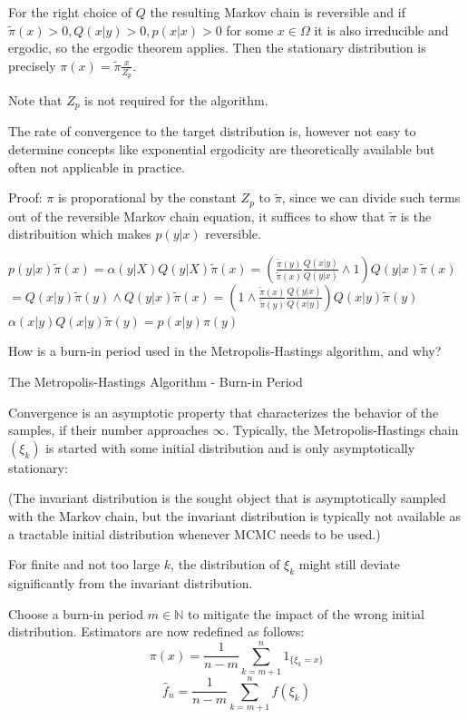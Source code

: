 For the right choice of \( Q \) the resulting Markov chain is reversible 
and if \( \tilde{\pi}(x) > 0, Q(x|y) > 0, p(x|x) > 0  \) for some \( x \in \Omega \)
it is also irreducible and ergodic, so the ergodic theorem applies.
Then the stationary distribution is precisely \( \pi(x) = \tilde{\pi }\frac{x}{Z_p} \).

Note that \( Z_p \) is not required for the algorithm.

The rate of convergence to the target distribution is, however not easy to determine
concepts like exponential ergodicity are theoretically available but often not applicable in practice.

Proof: 
\( \pi \) is proporational by the constant \( Z_p \) to \( \tilde{\pi} \), since we can divide such terms out of the 
reversible Markov chain equation, it suffices to show that \( \tilde{\pi} \) is the distribuition which makes \( p(y|x) \) reversible.

\( p(y|x)\tilde{\pi}(x) = \alpha(y|X)Q(y|X)\tilde{\pi}(x) = (\frac{\tilde{\pi}(y)}{\tilde{\pi}(x)} \frac{Q(x|y)}{Q(y|x)} \wedge 1)Q(y|x)\tilde{\pi}(x) \)
\( =  Q(x|y)\tilde{\pi}(y) \wedge Q(y|x)\tilde{\pi}(x) = (1 \wedge \frac{\tilde{\pi}(x)}{\tilde{\pi}(y)} \frac{Q(y|x)}{Q(x|y)})Q(x|y)\tilde{\pi}(y) \)
\( \alpha(x|y)Q(x|y)\tilde{\pi}(y) = p(x|y)\pi(y) \)

How is a burn-in period used in the Metropolis-Hastings algorithm, and why?


The Metropolis-Hastings Algorithm - Burn-in Period

Convergence is an asymptotic property that characterizes the behavior of the samples, if their number approaches \(\infty\).
Typically, the Metropolis-Hastings chain \((\xi_{k})\) is started with some initial distribution and is only asymptotically stationary:

(The invariant distribution is the sought object that is asymptotically sampled with the Markov chain, but the invariant distribution is typically not available as a tractable initial distribution whenever MCMC needs to be used.)

For finite and not too large \(k\), the distribution of \(\xi_{k}\) might still deviate significantly from the invariant distribution.

Choose a burn-in period \(m \in \mathbb{N}\) to mitigate the impact of the wrong initial distribution.
Estimators are now redefined as follows:
\[
\pi(x) = \frac{1}{n-m} \sum_{k=m+1}^{n} 1_{\{\xi_{k}=x\}}
\]
\[
\hat{f}_{n} = \frac{1}{n-m} \sum_{k=m+1}^{n} f(\xi_{k})
\]

